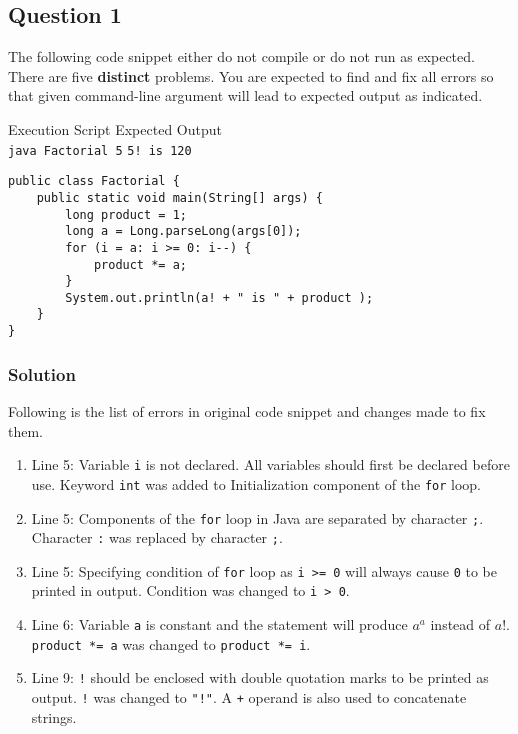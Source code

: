 \documentclass[12pt,letterpaper,twoside]{article}
\begin{document}


\subsection*{Question 1}

The following code snippet either do not compile or do not run as expected. There are five \textbf{distinct} problems. You are expected to find and fix all errors so that given command-line argument will lead to expected output as indicated.

\lstset{language=java, tabsize=2}
Execution Script \hfill Expected Output\\
\texttt{java Factorial 5} \hfill \texttt{5! is 120}
\begin{lstlisting}
public class Factorial {
	public static void main(String[] args) {
		long product = 1;
		long a = Long.parseLong(args[0]);
		for (i = a: i >= 0: i--) {
			product *= a;
		}
		System.out.println(a! + " is " + product );
	}
}
\end{lstlisting}

\subsubsection*{Solution}

Following is the list of errors in original code snippet and changes made to fix them.

\begin{enumerate}[label=\arabic*.]
\item Line 5: Variable \texttt{i} is not declared. All variables should first be declared before use. Keyword \texttt{int} was added to Initialization component of the \texttt{for} loop.
\item Line 5: Components of the \texttt{for} loop in Java are separated by character \texttt{;}. Character \texttt{:} was replaced by character \texttt{;}.
\item Line 5: Specifying condition of \texttt{for} loop as \texttt{i >= 0} will always cause \texttt{0} to be printed in output. Condition was changed to \texttt{i > 0}.
\item Line 6: Variable \texttt{a} is constant and the statement will produce $a^a$ instead of $a!$. \texttt{product *= a} was changed to \texttt{product *= i}.
\item Line 9: \texttt{!} should be enclosed with double quotation marks to be printed as output. \texttt{!} was changed to \texttt{"!"}. A \texttt{+} operand is also used to concatenate strings.
\end{enumerate}
\end{document}
